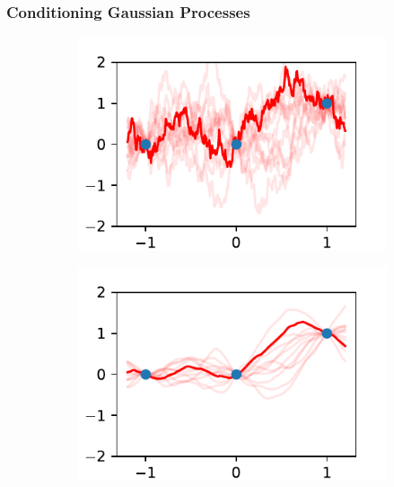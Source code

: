 \documentclass{beamer}
\begin{document}
\begin{frame}
    \frametitle{Conditioning Gaussian Processes}
    \begin{figure}
        \centering
        \begin{subfigure}[t]{0.4\textwidth}
            \centering
            \includegraphics[width=\textwidth]{flatish_GP_matern_5.0_tenths.pdf}
        \end{subfigure}%
        \begin{subfigure}[t]{0.4\textwidth}
            \centering
            \includegraphics[width=\textwidth]{flatish_GP_matern_15.0_tenths.pdf}
        \end{subfigure}
        \begin{subfigure}[t]{0.4\textwidth}
            \centering

\end{subfigure}
\end{figure}
\end{frame}
\end{document}
